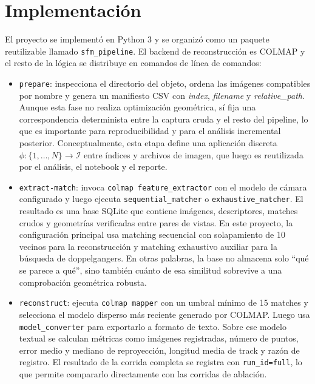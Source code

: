 \documentclass[conference]{IEEEtran}
\begin{document}
\section{Implementaci\'on}\label{sec:impl}

El proyecto se implement\'o en Python 3 y se organiz\'o como un paquete reutilizable llamado \texttt{sfm\_pipeline}. El backend de reconstrucci\'on es COLMAP y el resto de la l\'ogica se distribuye en comandos de l\'inea de comandos:

\begin{itemize}
  \item \texttt{prepare}: inspecciona el directorio del objeto, ordena las im\'agenes compatibles por nombre y genera un manifiesto CSV con \emph{index}, \emph{filename} y \emph{relative\_path}. Aunque esta fase no realiza optimizaci\'on geom\'etrica, s\'i fija una correspondencia determinista entre la captura cruda y el resto del pipeline, lo que es importante para reproducibilidad y para el an\'alisis incremental posterior. Conceptualmente, esta etapa define una aplicaci\'on discreta \(\phi:\{1,\dots,N\}\rightarrow\mathcal{I}\) entre \'indices y archivos de imagen, que luego es reutilizada por el an\'alisis, el notebook y el reporte.

  \item \texttt{extract-match}: invoca \texttt{colmap feature\_extractor} con el modelo de c\'amara configurado y luego ejecuta \texttt{sequential\_matcher} o \texttt{exhaustive\_matcher}. El resultado es una base SQLite que contiene im\'agenes, descriptores, matches crudos y geometr\'ias verificadas entre pares de vistas. En este proyecto, la configuraci\'on principal usa matching secuencial con solapamiento de 10 vecinos para la reconstrucci\'on y matching exhaustivo auxiliar para la b\'usqueda de doppelgangers. En otras palabras, la base no almacena solo ``qu\'e se parece a qu\'e'', sino tambi\'en cu\'anto de esa similitud sobrevive a una comprobaci\'on geom\'etrica robusta.

  \item \texttt{reconstruct}: ejecuta \texttt{colmap mapper} con un umbral m\'inimo de 15 matches y selecciona el modelo disperso m\'as reciente generado por COLMAP. Luego usa \texttt{model\_converter} para exportarlo a formato de texto. Sobre ese modelo textual se calculan m\'etricas como im\'agenes registradas, n\'umero de puntos, error medio y mediano de reproyecci\'on, longitud media de track y raz\'on de registro. El resultado de la corrida completa se registra con \texttt{run\_id=full}, lo que permite compararlo directamente con las corridas de ablaci\'on.


\end{itemize}
\end{document}
